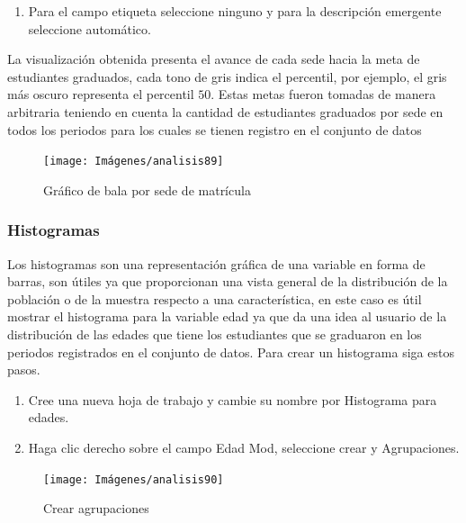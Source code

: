 \documentclass[
]{book}
\providecommand{\tightlist}{%
  \setlength{\itemsep}{0pt}\setlength{\parskip}{0pt}}
\begin{document}
\begin{enumerate}
\def\labelenumi{\arabic{enumi}.}
\setcounter{enumi}{8}
\tightlist
\item
  Para el campo etiqueta seleccione ninguno y para la descripción emergente seleccione automático.
\end{enumerate}

La visualización obtenida presenta el avance de cada sede hacia la meta de estudiantes graduados, cada tono de gris indica el percentil, por ejemplo, el gris más oscuro representa el percentil \(50\). Estas metas fueron tomadas de manera arbitraria teniendo en cuenta la cantidad de estudiantes graduados por sede en todos los periodos para los cuales se tienen registro en el conjunto de datos

\begin{figure}

{\centering \texttt{[image: Imágenes/analisis89]} 

}

\caption{Gráfico de bala por sede de matrícula}\label{fig:graficobala-fig}
\end{figure}

\hypertarget{histograma}{%
\subsubsection{Histogramas}\label{histograma}}

Los histogramas son una representación gráfica de una variable en forma de barras, son útiles ya que proporcionan una vista general de la distribución de la población o de la muestra respecto a una característica, en este caso es útil mostrar el histograma para la variable edad ya que da una idea al usuario de la distribución de las edades que tiene los estudiantes que se graduaron en los periodos registrados en el conjunto de datos. Para crear un histograma siga estos pasos.

\begin{enumerate}
\def\labelenumi{\arabic{enumi}.}
\item
  Cree una nueva hoja de trabajo y cambie su nombre por Histograma para edades.
\item
  Haga clic derecho sobre el campo Edad Mod, seleccione crear y Agrupaciones.
\end{enumerate}

\begin{figure}

{\centering \texttt{[image: Imágenes/analisis90]} 

}

\caption{Crear agrupaciones}\label{fig:paso2histograma-fig}
\end{figure}
\end{document}
